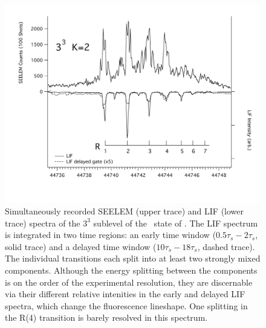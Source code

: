 \documentclass[12pt]{mitthesis}
\begin{document}


\begin{figure}
  \caption{Simultaneously recorded SEELEM (upper trace) and LIF (lower
    trace) spectra of the $3^3$  sublevel of the \astate\ state
    of .  The LIF spectrum is integrated in two time regions:
    an early time window ($0.5\tau_s-2\tau_s$, solid trace) and a
    delayed time window ($10\tau_s-18\tau_s$, dashed trace).  The
    individual transitions each split into at least two strongly mixed
    components.  Although the energy splitting between the components
    is on the order of the experimental resolution, they are
    discernable via their different relative intenities in the early
    and delayed LIF spectra, which change the fluorescence lineshape.
    One splitting in the R(4) transition is barely resolved in this
    spectrum.  }
  \label{fig:spectrum-33k2}
  \centering
  \includegraphics[width=7in,angle=90]{spectrum-33k2-r1r7.pdf}
\end{figure}
\end{document}
